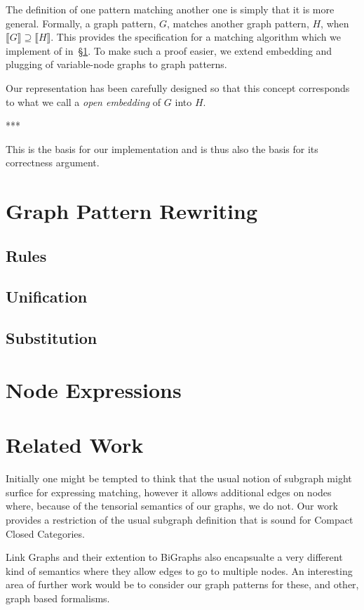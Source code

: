 \documentclass[runningheads]{llncs}
\newcommand{\minterp}[1]{\llbracket #1 \rrbracket}
\begin{document}
The definition of one pattern matching another one is simply that it
is more general. Formally, a graph pattern, $G$, matches another graph
pattern, $H$, when $\minterp{G} \supseteq \minterp{H}$. This provides
the specification for a matching algorithm which we implement of
in~\S\ref{sec:rewriting}. To make such a proof easier, we extend
embedding and plugging of variable-node graphs to graph patterns. 

Our representation has been carefully designed so that this concept
corresponds to what we call a \emph{open embedding} of $G$ into
$H$. 

*** 

This is the basis for our implementation and is thus also the basis
for its correctness argument. 




\section{Graph Pattern Rewriting}
\label{sec:rewriting}

\subsection{Rules}
\subsection{Unification}
\subsection{Substitution}


\section{Node Expressions}
\label{sec:node-expressions}


\section{Related Work}
\label{sec:relatedwork}

Initially one might be tempted to think that the usual notion of
subgraph might surfice for expressing matching, however it allows
additional edges on nodes where, because of the tensorial semantics of
our graphs, we do not. Our work provides a restriction of the usual
subgraph definition that is sound for Compact Closed Categories.

Link Graphs and their extention to BiGraphs also encapsualte a very
different kind of semantics where they allow edges to go to multiple
nodes. An interesting area of further work would be to consider our
graph patterns for these, and other, graph based formalisms.
\end{document}
